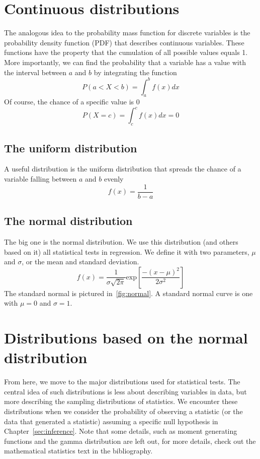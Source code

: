 \section{Continuous distributions}
\label{sec:condist}
The analogous idea to the probability mass function for discrete variables is the probability density function (PDF) that describes continuous variables. These functions have the property that the cumulation of all possible values equals 1. More importantly, we can find the probability that a variable has a value with the interval between $a$ and $b$ by integrating the function
\begin{equation}
P\left(a < X < b\right) = \int_a^b f(x)dx
\end{equation}
Of course, the chance of a specific value is 0
\begin{equation}
P\left(X = c\right) = \int_c^c f(x)dx = 0
\end{equation}
\subsection{The uniform distribution}

A useful distribution is the uniform distribution that spreads the chance of a variable falling between $a$ and $b$ evenly
\begin{equation}
f(x) = \frac{1}{b-a}
\end{equation}

\subsection{The normal distribution}
\label{sec:normaldist}
The big one is the normal distribution. We use this distribution (and others based on it) all statistical tests in regression. We define it with two parameters, $\mu$ and $\sigma$, or the mean and standard deviation.
\begin{equation}
f(x) = \frac{1}{\sigma\sqrt{2\pi}}\mbox{exp}\left[\frac{-\left(x-\mu\right)^2}{2\sigma^2}\right]
\end{equation}
The standard normal is pictured in~\ref{fig:normal}. A standard normal curve is one with $\mu = 0$ and $\sigma = 1$.

\section{Distributions based on the normal distribution}

From here, we move to the major distributions used for statistical tests. The central idea of such distributions is less about describing variables in data, but more describing the sampling distributions of statistics. We encounter these distributions when we consider the probability of observing a statistic (or the data that generated a statistic) assuming a specific null hypothesis in Chapter~\ref{sec:inference}. Note that some details, such as moment generating functions and the gamma distribution are left out, for more details, check out the mathematical statistics text in the bibliography.

